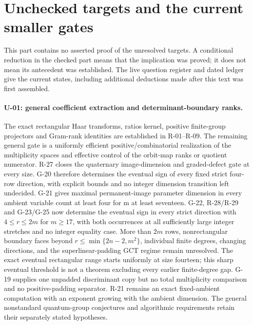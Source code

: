 \section{Unchecked targets and the current smaller gates}

This part contains no asserted proof of the unresolved targets. A conditional reduction in the checked part means that the implication was proved; it does not mean its antecedent was established. The live question register and dated ledger give the current states, including additional deductions made after this text was first assembled.

\paragraph{U-01: general coefficient extraction and determinant-boundary ranks.}
The exact rectangular Haar transforms, ratios kernel, positive finite-group projectors and Gram-rank identities are established in R-01--R-09. The remaining general gate is a uniformly efficient positive/combinatorial realization of the multiplicity spaces and effective control of the orbit-map ranks or quotient numerator. R-27 closes the quaternary image-dimension and graded-defect gate at every size. G-20 therefore determines the eventual sign of every fixed strict four-row direction, with explicit bounds and no integer dimension transition left undecided. G-21 gives maximal permanent-image parameter dimension in every ambient variable count at least four for m at least seventeen. G-22, R-28/R-29 and G-23/G-25 now determine the eventual sign in every strict direction with $4\le r\le2m$ for $m\ge17$, with both occurrences at all sufficiently large integer stretches and no integer equality case. More than $2m$ rows, nonrectangular boundary faces beyond $r\le\min\{2n-2,m^2\}$, individual finite degrees, changing directions, and the superlinear-padding GCT regime remain unresolved. The exact eventual rectangular range starts uniformly at size fourteen; this sharp eventual threshold is not a theorem excluding every earlier finite-degree gap. G-19 supplies one unpadded discriminant copy but no total multiplicity comparison and no positive-padding separator. R-21 remains an exact fixed-ambient computation with an exponent growing with the ambient dimension. The general nonstandard quantum-group conjectures and algorithmic requirements retain their separately stated hypotheses.

